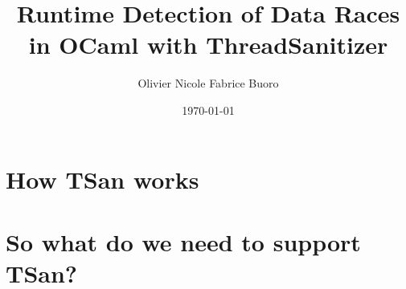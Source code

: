 \documentclass[aspectratio=169,compress,10pt,usenames,dvipsnames,svgnames]{beamer}
\title[ThreadSanitizer for OCaml]{Runtime Detection of Data Races in OCaml with ThreadSanitizer}
\author{Olivier Nicole \qquad Fabrice Buoro \bigskip}
\institute{Tarides}
\date{\today}
\begin{document}
\begin{frame}
  \titlepage
\end{frame}



\section{How TSan works}


\section{So what do we need to support TSan?}



\end{document}
